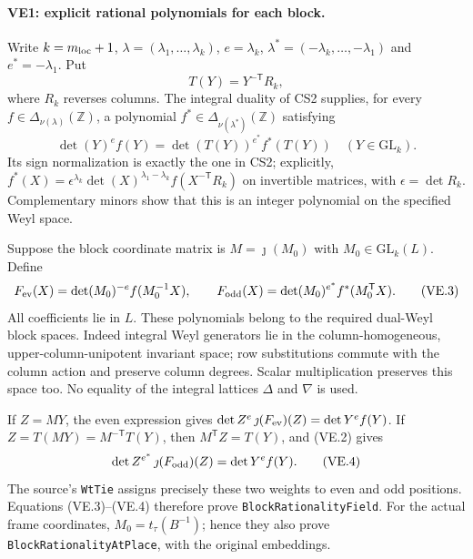 \paragraph{VE1: explicit rational polynomials for each block.}
Write $k=m_{\rm loc}+1$, $\lambda=(\lambda_1,\ldots,\lambda_k)$,
$e=\lambda_k$, $\lambda^*=(-\lambda_k,\ldots,-\lambda_1)$ and
$e^*=-\lambda_1$. Put
\[
 T(Y)=Y^{-\mathsf T}R_k,
\]
where $R_k$ reverses columns. The integral duality of CS2 supplies,
for every $f\in\Delta_{\nu(\lambda)}(\mathbb Z)$, a polynomial
$f^*\in\Delta_{\nu(\lambda^*)}(\mathbb Z)$ satisfying
\[
 \det(Y)^e f(Y)=\det(T(Y))^{e^*}f^*(T(Y))
       \quad(Y\in\mathrm{GL}_k).
                                                        \tag{VE.2}
\]
Its sign normalization is exactly the one in CS2; explicitly,
$f^*(X)=\epsilon^{\lambda_k}\det(X)^{\lambda_1-\lambda_k}
f(X^{-\mathsf T}R_k)$ on invertible matrices, with
$\epsilon=\det R_k$. Complementary minors show that this is an
integer polynomial on the specified Weyl space.

Suppose the block coordinate matrix is $M=\jmath(M_0)$ with
$M_0\in\mathrm{GL}_k(L)$. Define
\[
 F_{\rm ev}(X)=\det(M_0)^{-e}f(M_0^{-1}X),\qquad
 F_{\rm odd}(X)=\det(M_0)^{e^*}f^*(M_0^{\mathsf T}X).
                                                        \tag{VE.3}
\]
All coefficients lie in $L$. These polynomials belong to the
required dual-Weyl block spaces. Indeed integral Weyl generators lie
in the column-homogeneous, upper-column-unipotent invariant space;
row substitutions commute with the column action and preserve
column degrees. Scalar multiplication preserves this space too.
No equality of the integral lattices $\Delta$ and $\nabla$ is used.

If $Z=MY$, the even expression gives
$\det Z^e\,\jmath(F_{\rm ev})(Z)=\det Y^e f(Y)$.
If $Z=T(MY)=M^{-\mathsf T}T(Y)$, then
$M^{\mathsf T}Z=T(Y)$, and (VE.2) gives
\[
 \det Z^{e^*}\,\jmath(F_{\rm odd})(Z)=\det Y^e f(Y).
                                                        \tag{VE.4}
\]
The source's \texttt{WtTie} assigns precisely these two weights to
even and odd positions. Equations (VE.3)--(VE.4) therefore prove
\texttt{BlockRationalityField}. For the actual frame coordinates,
$M_0=t_\tau(B^{-1})$; hence they also prove
\texttt{BlockRationalityAtPlace}, with the original embeddings.

